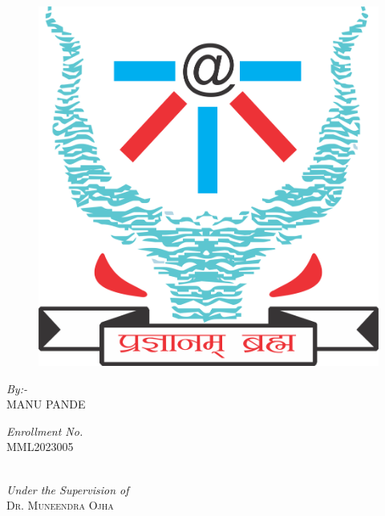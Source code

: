 \begin{titlepage}
\begin{center}
\begin{spacing}{1.2}
\vspace {3mm}
\begin{figure}[htp]
    \centering
    \includegraphics[scale=0.28]{Figures/IIITA_Logo.png}
\end{figure}
\begin{minipage}[t]{0.5\textwidth}
    \begin{flushleft} \large
        \textit{By:-} \\%
            \textsc{MANU PANDE} %
    \end{flushleft}
\end{minipage}
\begin{minipage}[t]{0.45\textwidth}
    \begin{flushright} \large
        \textit{Enrollment No.} \\
            \textsc{MML2023005} %
    \end{flushright}
\end{minipage}\\[1cm]

\textit{Under the Supervision of}\\[2mm]
\textsc{\Large Dr. Muneendra Ojha}\\%


\end{spacing}
\end{center}
\end{titlepage}
